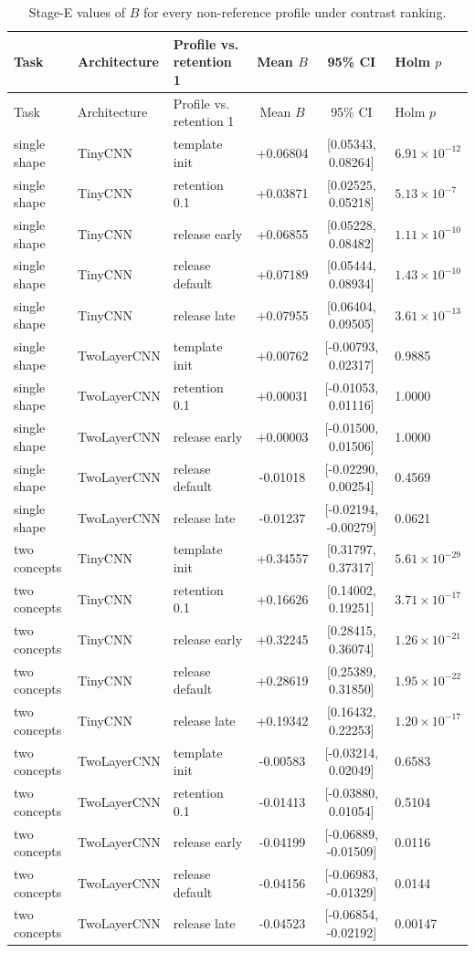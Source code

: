 {
\small
\setlength{\tabcolsep}{3.5pt}
\begin{longtable}{lllccl}
\caption{Stage-E values of $B$ for every non-reference profile under contrast ranking.}\label{tab:stage-e-profiles}\\
\toprule
Task & Architecture & Profile vs. retention 1 & Mean $B$ & 95\% CI & Holm $p$ \\
\midrule
\endfirsthead
\toprule
Task & Architecture & Profile vs. retention 1 & Mean $B$ & 95\% CI & Holm $p$ \\
\midrule
\endhead
\bottomrule
\endfoot
single shape & TinyCNN & template init & +0.06804 & [0.05343, 0.08264] & $6.91\times10^{-12}$ \\
single shape & TinyCNN & retention 0.1 & +0.03871 & [0.02525, 0.05218] & $5.13\times10^{-7}$ \\
single shape & TinyCNN & release early & +0.06855 & [0.05228, 0.08482] & $1.11\times10^{-10}$ \\
single shape & TinyCNN & release default & +0.07189 & [0.05444, 0.08934] & $1.43\times10^{-10}$ \\
single shape & TinyCNN & release late & +0.07955 & [0.06404, 0.09505] & $3.61\times10^{-13}$ \\
single shape & TwoLayerCNN & template init & +0.00762 & [-0.00793, 0.02317] & 0.9885 \\
single shape & TwoLayerCNN & retention 0.1 & +0.00031 & [-0.01053, 0.01116] & 1.0000 \\
single shape & TwoLayerCNN & release early & +0.00003 & [-0.01500, 0.01506] & 1.0000 \\
single shape & TwoLayerCNN & release default & -0.01018 & [-0.02290, 0.00254] & 0.4569 \\
single shape & TwoLayerCNN & release late & -0.01237 & [-0.02194, -0.00279] & 0.0621 \\
two concepts & TinyCNN & template init & +0.34557 & [0.31797, 0.37317] & $5.61\times10^{-29}$ \\
two concepts & TinyCNN & retention 0.1 & +0.16626 & [0.14002, 0.19251] & $3.71\times10^{-17}$ \\
two concepts & TinyCNN & release early & +0.32245 & [0.28415, 0.36074] & $1.26\times10^{-21}$ \\
two concepts & TinyCNN & release default & +0.28619 & [0.25389, 0.31850] & $1.95\times10^{-22}$ \\
two concepts & TinyCNN & release late & +0.19342 & [0.16432, 0.22253] & $1.20\times10^{-17}$ \\
two concepts & TwoLayerCNN & template init & -0.00583 & [-0.03214, 0.02049] & 0.6583 \\
two concepts & TwoLayerCNN & retention 0.1 & -0.01413 & [-0.03880, 0.01054] & 0.5104 \\
two concepts & TwoLayerCNN & release early & -0.04199 & [-0.06889, -0.01509] & 0.0116 \\
two concepts & TwoLayerCNN & release default & -0.04156 & [-0.06983, -0.01329] & 0.0144 \\
two concepts & TwoLayerCNN & release late & -0.04523 & [-0.06854, -0.02192] & 0.00147 \\
\end{longtable}
\normalsize
}

